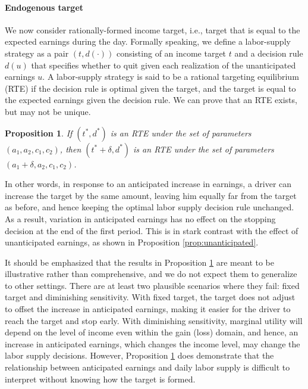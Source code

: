 \documentclass[reviewmode]{restat}
\newtheorem{proposition}{Proposition}
\begin{document}
\paragraph{Endogenous target} We now consider rationally-formed income target, i.e., target that is equal
to the expected earnings during the day. Formally speaking, we define a labor-supply strategy as a pair 
$(t, d(\cdot))$ consisting of an income target $t$ and a decision rule $d(u)$ that specifies whether to quit
given each realization of the unanticipated earnings $u$. A labor-supply strategy is said to be a rational
targeting equilibrium (RTE) if the decision rule  is optimal given the target, and the target is equal to
the expected earnings given the decision rule. We can prove that an RTE exists, but may not be unique. 
\begin{proposition}
\label{prop:anticipated}
If $(t^*, d^*)$ is an RTE under the set of parameters $(a_1, a_2, c_1, c_2)$, then $(t^*+\delta, d^*)$ is
an RTE under the set of parameters  $(a_1+\delta, a_2, c_1, c_2)$.
\end{proposition}


In other words, in response to an anticipated increase in earnings, a driver can increase the target by 
the same amount, leaving him equally far from the target as before, and hence keeping the optimal labor 
supply decision rule unchanged. As a result, variation in anticipated earnings has no effect on the stopping
decision at the end of the first period. This is in stark contrast with the effect of unanticipated earnings, 
as shown in Proposition \ref{prop:unanticipated}.

It should be emphasized that the results in Proposition \ref{prop:anticipated} are meant to be illustrative
rather than comprehensive, and we do not expect them to generalize to other settings. There are at least two 
plausible scenarios where they fail: fixed target and diminishing sensitivity. With fixed target, the target 
does not adjust to offset the increase in anticipated earnings, making it easier for the driver to reach the 
target and stop early. With diminishing sensitivity, marginal utility will depend on the level of income even
within the gain (loss) domain, and hence, an increase in anticipated earnings, which changes the income level,
may change the labor supply decisions. However, Proposition \ref{prop:anticipated} does demonstrate that the 
relationship between anticipated earnings and daily labor supply is difficult to interpret without knowing how
the target is formed. 
\end{document}
